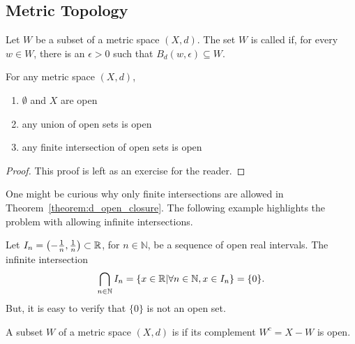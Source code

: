 
\subsection{Metric Topology}

\begin{definition}
\label{definition:metspace_dopen}
Let $W$ be a subset of a metric space $(X,d)$.
The set $W$ is called  if, for every $w\in W$, there is an $\epsilon>0$ such that $B_d (w,\epsilon) \subseteq W$.
\end{definition}

\begin{theorem}
\label{theorem:d_open_closure}
For any metric space $(X,d)$,
\begin{enumerate}
\item $\emptyset$ and $X$ are open
\item any union of open sets is open
\item any finite intersection of open sets is open
\end{enumerate}
\end{theorem}
\begin{proof}
This proof is left as an exercise for the reader.
\end{proof}

One might be curious why only finite intersections are allowed in Theorem~\ref{theorem:d_open_closure}.
The following example highlights the problem with allowing infinite intersections.
\begin{example}
Let $I_n = \left(-\frac{1}{n},\frac{1}{n} \right) \subset \mathbb{R}$, for $n\in \mathbb{N}$, be a sequence of open real intervals.
The infinite intersection
\[ \bigcap_{n\in \mathbb{N}} I_n = \{ x\in \mathbb{R} | \forall n\in \mathbb{N}, x\in I_n \} = \{0 \}. \]
But, it is easy to verify that $\{ 0 \}$ is not an open set.
\end{example}

\begin{definition}
A subset $W$ of a metric space $(X,d)$ is  if its complement $W^c = X-W$ is open.
\end{definition}

